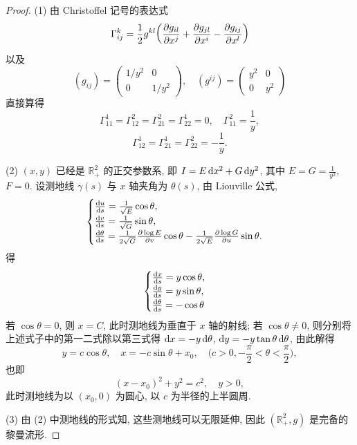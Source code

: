 \begin{proof}
  (1) 由 Christoffel 记号的表达式
  \[\Gamma_{ij}^k = \frac{1}{2}g^{kl}\biggl(\pdv{g_{il}}{x^j}
    + \pdv{g_{jl}}{x^i} - \pdv{g_{ij}}{x^l}\biggr)\]
  以及
  \[(g_{ij})=\begin{pmatrix}
    1/y^2 & 0 \\ 0 & 1/y^2
  \end{pmatrix},\quad
  (g^{ij})=\begin{pmatrix}
    y^2 & 0 \\ 0 & y^2
  \end{pmatrix}\]
  直接算得
  \[\Gamma_{11}^1 = \Gamma_{12}^2 = \Gamma_{21}^2 = \Gamma_{22}^1 = 0,
    \quad \Gamma_{11}^2 = \frac{1}{y},\]
  \[\Gamma_{12}^1 = \Gamma_{21}^1 = \Gamma_{22}^2 = -\frac{1}{y}.\]

  (2) $(x,y)$ 已经是 $\mathbb{R}^2_+$ 的正交参数系, 即 $I=E\mathop{}\!\mathrm{d} x^2+G\mathop{}\!\mathrm{d} y^2$,
  其中 $E=G=\frac{1}{y^2}$, $F=0$. 设测地线 $\gamma(s)$ 与 $x$ 轴夹角为 $\theta(s)$,
  由 Liouville 公式,
  \[\begin{cases}
    \frac{\mathop{}\!\mathrm{d} u}{\mathop{}\!\mathrm{d} s} = \frac{1}{\sqrt{E}}\cos\theta, \\ 
    \frac{\mathop{}\!\mathrm{d} v}{\mathop{}\!\mathrm{d} s} = \frac{1}{\sqrt{G}}\sin\theta, \\
    \frac{\mathop{}\!\mathrm{d}\theta}{\mathop{}\!\mathrm{d} s} = \frac{1}{2\sqrt{G}}\frac{\partial\log E}{\partial v}\cos\theta
      - \frac{1}{2\sqrt{E}}\frac{\partial\log G}{\partial u}\sin\theta.
  \end{cases}\]
  得
  \[\begin{cases}
    \frac{\mathop{}\!\mathrm{d} x}{\mathop{}\!\mathrm{d} s} = y\cos\theta, \\
    \frac{\mathop{}\!\mathrm{d} y}{\mathop{}\!\mathrm{d} s} = y\sin\theta, \\
    \frac{\mathop{}\!\mathrm{d}\theta}{\mathop{}\!\mathrm{d} s} = -\cos\theta
  \end{cases}\]
  若 $\cos\theta=0$, 则 $x=C$, 此时测地线为垂直于 $x$ 轴的射线;
  若 $\cos\theta\neq 0$, 则分别将上述式子中的第一二式除以第三式得
  $\mathop{}\!\mathrm{d} x=-y\mathop{}\!\mathrm{d}\theta$, $\mathop{}\!\mathrm{d} y=-y\tan\theta\mathop{}\!\mathrm{d}\theta$, 由此解得
  \[y = c\cos\theta,\quad x = -c\sin\theta+x_0,\quad\biggl(c>0,-\frac{\pi}{2}<\theta<\frac{\pi}{2}\biggr),\]
  也即
  \[(x-x_0)^2+y^2 = c^2,\quad y>0,\]
  此时测地线为以 $(x_0,0)$ 为圆心, 以 $c$ 为半径的上半圆周.

  (3) 由 (2) 中测地线的形式知, 这些测地线可以无限延伸, 因此 $(\mathbb{R}^2_+,g)$
  是完备的黎曼流形.


\end{proof}
